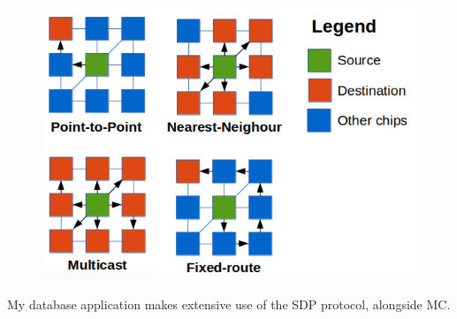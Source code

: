 \begin{figure}
  \centering
  \includegraphics[width=1\linewidth, natwidth=578, natheight=420]{images/packet_types.png}
  \label{fig:comm_protocols}
\end{figure}

My database application makes extensive use of the SDP protocol, alongside MC.